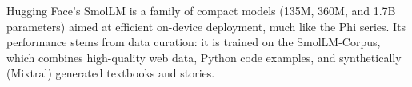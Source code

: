 \begin{description}[font=\bfseries]
    \item[SmolLM] \citep{allal2025smollm} Hugging Face's SmolLM is a family of compact models (135M, 360M, and 1.7B parameters) aimed at efficient on-device deployment, much like the Phi series. Its performance stems from data curation: it is trained on the SmolLM-Corpus, which combines high-quality web data, Python code examples, and synthetically (Mixtral) generated textbooks and stories.
\end{description}







